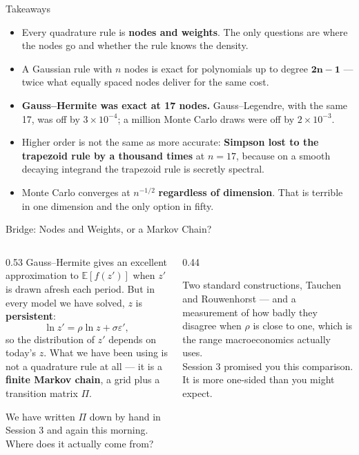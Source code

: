 \begin{frame}{Takeaways}
\begin{takeawaybox}
\begin{itemize}\small
  \item Every quadrature rule is \textbf{nodes and weights}. The only questions are where the nodes go and whether the rule knows the density.
  \item A Gaussian rule with $n$ nodes is exact for polynomials up to degree $\mathbf{2n-1}$ --- twice what equally spaced nodes deliver for the same cost.
  \item \textbf{Gauss--Hermite was exact at 17 nodes.} Gauss--Legendre, with the same 17, was off by $3\times10^{-4}$; a million Monte Carlo draws were off by $2\times10^{-3}$.
  \item Higher order is not the same as more accurate: \textbf{Simpson lost to the trapezoid rule by a thousand times} at $n=17$, because on a smooth decaying integrand the trapezoid rule is secretly spectral.
  \item Monte Carlo converges at $n^{-1/2}$ \textbf{regardless of dimension}. That is terrible in one dimension and the only option in fifty.
\end{itemize}
\end{takeawaybox}
\end{frame}

\begin{frame}{Bridge: Nodes and Weights, or a Markov Chain?}
\begin{columns}[T]
\begin{column}{0.53\textwidth}
\small
Gauss--Hermite gives an excellent approximation to $\mathbb{E}[f(z')]$ when $z'$ is drawn afresh each period. But in every model we have solved, $z$ is \textbf{persistent}:
\[
  \ln z'=\rho\ln z+\sigma\varepsilon' ,
\]
so the distribution of $z'$ depends on today's $z$. What we have been using is not a quadrature rule at all --- it is a \textbf{finite Markov chain}, a grid plus a transition matrix $\Pi$.
\medskip

We have written $\Pi$ down by hand in Session 3 and again this morning. Where does it actually come from?
\end{column}
\begin{column}{0.44\textwidth}
\begin{conceptbox}[title=\textbf{Next (4.B3)}]\small
Two standard constructions, Tauchen and Rouwenhorst --- and a measurement of how badly they disagree when $\rho$ is close to one, which is the range macroeconomics actually uses.\\[1mm]
Session 3 promised you this comparison. It is more one-sided than you might expect.
\end{conceptbox}
\end{column}
\end{columns}
\end{frame}



